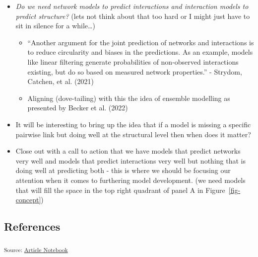 \documentclass[
]{agujournal2019}
\begin{document}
\begin{itemize}
\item
  \emph{Do we need network models to predict interactions and
  interaction models to predict structure?} (lets not think about that
  too hard or I might just have to sit in silence for a while\ldots)

  \begin{itemize}
  \item
    ``Another argument for the joint prediction of networks and
    interactions is to reduce circularity and biases in the predictions.
    As an example, models like linear filtering generate probabilities
    of non-observed interactions existing, but do so based on measured
    network properties.'' - Strydom, Catchen, et al. (2021)
  \item
    Aligning (dove-tailing) with this the idea of ensemble modelling as
    presented by Becker et al. (2022)
  \end{itemize}
\item
  It will be interesting to bring up the idea that if a model is missing
  a specific pairwise link but doing well at the structural level then
  when does it matter?
\item
  Close out with a call to action that we have models that predict
  networks very well and models that predict interactions very well but
  nothing that is doing well at predicting both - this is where we
  should be focusing our attention when it comes to furthering model
  development. (we need models that will fill the space in the top right
  quadrant of panel A in Figure~\ref{fig-concept})
\end{itemize}

\subsection*{References}\label{references}

\vspace{1em}

\textsubscript{Source:
\href{https://BecksLab.github.io/ms_t_is_for_topology/index.qmd.html}{Article
Notebook}}
\end{document}
